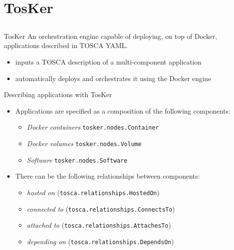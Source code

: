 \documentclass{beamer}
\begin{document}
\section{TosKer}\subsection*{}
  \begin{frame}{TosKer}
    An orchestration engine capable of deploying, on top of Docker, applications described in TOSCA YAML.

    \begin{itemize}
      \item inputs a TOSCA description of a multi-component application
      \item automatically deploys and orchestrates it using the Docker engine
    \end{itemize}
  \end{frame}

  \begin{frame}{Describing applications with TosKer}
    \begin{itemize}
      \item Applications are specified as a composition of the following components:\begin{itemize}
          \item \small\emph{Docker containers} {\footnotesize\texttt{tosker.nodes.Container}}
          \item \small\emph{Docker volumes} {\footnotesize\texttt{tosker.nodes.Volume}}
          \item \small\emph{Software} {\footnotesize\texttt{tosker.nodes.Software}}
        \end{itemize}\pause
      \item There can be the following relationships between components:\begin{itemize}
          \item \small\emph{hosted on} {(\footnotesize\texttt{tosca.relationships.HostedOn})}
          \item \small\emph{connected to} {(\footnotesize\texttt{tosca.relationships.ConnectsTo})}
          \item \small\emph{attached to} {(\footnotesize\texttt{tosca.relationships.AttachesTo})}
          \item \small\emph{depending on} {(\footnotesize\texttt{tosca.relationships.DependsOn})}
        \end{itemize}
    \end{itemize}
  \end{frame}
\end{document}
